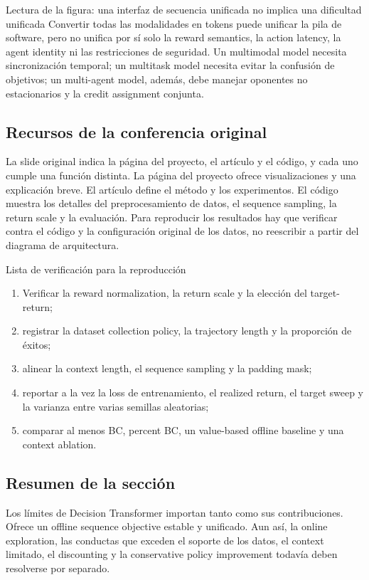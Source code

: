 \begin{knowledgebox}{Lectura de la figura: una interfaz de secuencia unificada no implica una dificultad unificada}
Convertir todas las modalidades en tokens puede unificar la pila de software, pero no unifica por sí solo la reward semantics, la action latency, la agent identity ni las restricciones de seguridad. Un multimodal model necesita sincronización temporal; un multitask model necesita evitar la confusión de objetivos; un multi-agent model, además, debe manejar oponentes no estacionarios y la credit assignment conjunta.
\end{knowledgebox}

\subsection{Recursos de la conferencia original}

La slide original indica la página del proyecto, el artículo y el código, y cada uno cumple una función distinta. La página del proyecto ofrece visualizaciones y una explicación breve. El artículo define el método y los experimentos. El código muestra los detalles del preprocesamiento de datos, el sequence sampling, la return scale y la evaluación. Para reproducir los resultados hay que verificar contra el código y la configuración original de los datos, no reescribir a partir del diagrama de arquitectura.


\begin{importantbox}{Lista de verificación para la reproducción}
\begin{enumerate}
  \item Verificar la reward normalization, la return scale y la elección del target-return;
  \item registrar la dataset collection policy, la trajectory length y la proporción de éxitos;
  \item alinear la context length, el sequence sampling y la padding mask;
  \item reportar a la vez la loss de entrenamiento, el realized return, el target sweep y la varianza entre varias semillas aleatorias;
  \item comparar al menos BC, percent BC, un value-based offline baseline y una context ablation.
\end{enumerate}
\end{importantbox}

\subsection{Resumen de la sección}

Los límites de Decision Transformer importan tanto como sus contribuciones. Ofrece un offline sequence objective estable y unificado. Aun así, la online exploration, las conductas que exceden el soporte de los datos, el context limitado, el discounting y la conservative policy improvement todavía deben resolverse por separado.
